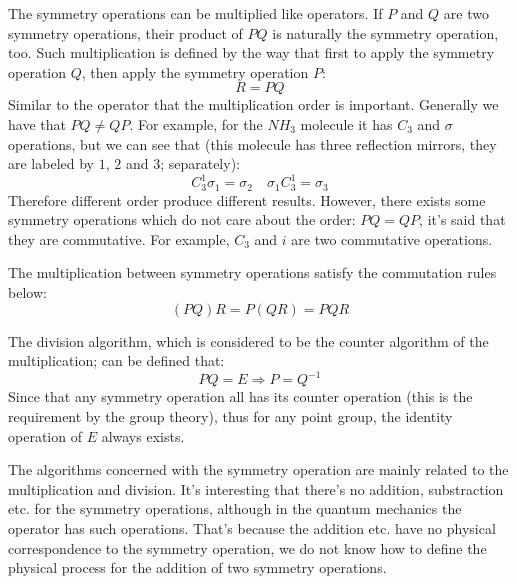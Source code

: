 The symmetry operations can be multiplied like operators. If $P$ and
$Q$ are two symmetry operations, their product of $PQ$ is naturally
the symmetry operation, too. Such multiplication is defined by the way
that first to apply the symmetry operation $Q$, then apply the
symmetry operation $P$:
\begin{equation}\label{}
  R = PQ
\end{equation}
Similar to the operator that the multiplication order is important.
Generally we have that $PQ \neq QP$. For example, for the $NH_{3}$
molecule it has $C_{3}$ and $\sigma$ operations, but we can see that
(this molecule has three reflection mirrors, they are labeled by $1$,
$2$ and $3$; separately):
\begin{equation}\label{}
  C_{3}^{1}\sigma_{1} = \sigma_{2} \quad  \sigma_{1}C_{3}^{1} =
  \sigma_{3}
\end{equation}
Therefore different order produce different results. However, there
exists some symmetry operations which do not care about the order:
$PQ=QP$, it's said that they are commutative. For example, $C_{3}$ and
$i$ are two commutative operations.

The multiplication between symmetry operations satisfy the commutation
rules below:
\begin{equation}\label{}
  (PQ)R = P(QR) = PQR
\end{equation}

The division algorithm, which is considered to be the counter
algorithm of the multiplication; can be defined that:
\begin{equation}\label{}
  PQ = E \Rightarrow P = Q^{-1}
\end{equation}
Since that any symmetry operation all has its counter operation (this
is the requirement by the group theory), thus for any point group, the
identity operation of $E$ always exists.

The algorithms concerned with the symmetry operation are mainly
related to the multiplication and division. It's interesting that
there's no addition, substraction etc. for the symmetry operations,
although in the quantum mechanics the operator has such operations.
That's because the addition etc. have no physical correspondence to
the symmetry operation, we do not know how to define the physical
process for the addition of two symmetry operations.

